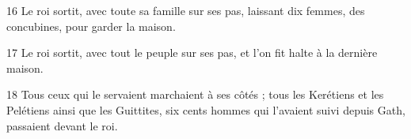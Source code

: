 
16 Le roi sortit, avec toute sa famille sur ses pas, laissant dix femmes, des concubines, pour garder la maison.

17 Le roi sortit, avec tout le peuple sur ses pas, et l’on fit halte à la dernière maison.

18 Tous ceux qui le servaient marchaient à ses côtés ; tous les Kerétiens et les Pelétiens ainsi que les Guittites, six cents hommes qui l’avaient suivi depuis Gath, passaient devant le roi.
